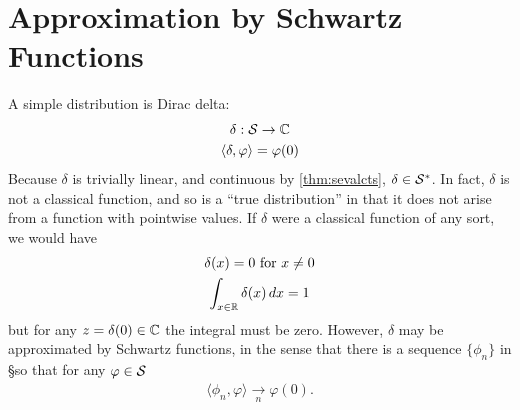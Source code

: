   \section{Approximation by Schwartz Functions}
    A simple distribution is Dirac delta:
    \begin{gather*}
      \delta:\S\rightarrow\C\\
      \langle\delta,\varphi\rangle = \varphi(0)
    \end{gather*}
    Because $\delta$ is trivially linear, and continuous by \cref{thm:sevalcts}, $\delta\in\SS$.
    In fact, $\delta$ is not a classical function, and so is a ``true distribution'' in that it does not arise from a function with pointwise values.
    If $\delta$ were a classical function of any sort, we would have
    \begin{gather*}
      \delta(x)=0\text{ for }x\ne0\\
      \int_{x\in\R} \delta(x)\,dx = 1
    \end{gather*}
    but for any $z=\delta(0)\in\C$ the integral must be zero.
    However, $\delta$ may be approximated by Schwartz functions, in the sense that there is a sequence $\{\phi_n\}$ in \S so that for any $\varphi\in\S$
    \begin{align*}
      \langle \phi_n, \varphi\rangle \underset{n}{\longrightarrow} \varphi(0)\text{.}
    \end{align*}

